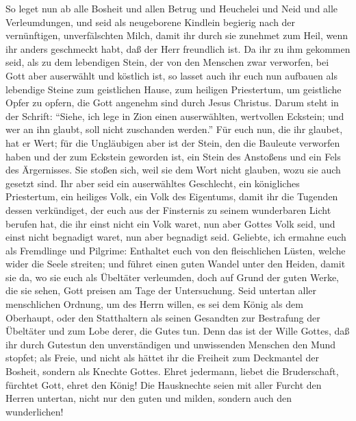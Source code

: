  So leget nun ab alle Bosheit und allen Betrug und
Heuchelei und Neid und alle Verleumdungen,  und seid als
neugeborene Kindlein begierig nach der vernünftigen, unverfälschten
Milch, damit ihr durch sie zunehmet zum Heil,  wenn ihr
anders geschmeckt habt, daß der Herr freundlich ist.  Da
ihr zu ihm gekommen seid, als zu dem lebendigen Stein, der von den
Menschen zwar verworfen, bei Gott aber auserwählt und köstlich ist,
 so lasset auch ihr euch nun aufbauen als lebendige Steine
zum geistlichen Hause, zum heiligen Priestertum, um geistliche Opfer zu
opfern, die Gott angenehm sind durch Jesus Christus. 
Darum steht in der Schrift: ``Siehe, ich lege in Zion einen
auserwählten, wertvollen Eckstein; und wer an ihn glaubt, soll nicht
zuschanden werden.''  Für euch nun, die ihr glaubet, hat
er Wert; für die Ungläubigen aber ist der Stein, den die Bauleute
verworfen haben und der zum Eckstein geworden ist, ein Stein des
Anstoßens und ein Fels des Ärgernisses.  Sie stoßen sich,
weil sie dem Wort nicht glauben, wozu sie auch gesetzt sind.
 Ihr aber seid ein auserwähltes Geschlecht, ein
königliches Priestertum, ein heiliges Volk, ein Volk des Eigentums,
damit ihr die Tugenden dessen verkündiget, der euch aus der Finsternis
zu seinem wunderbaren Licht berufen hat,  die ihr einst
nicht ein Volk waret, nun aber Gottes Volk seid, und einst nicht
begnadigt waret, nun aber begnadigt seid.  Geliebte, ich
ermahne euch als Fremdlinge und Pilgrime: Enthaltet euch von den
fleischlichen Lüsten, welche wider die Seele streiten; 
und führet einen guten Wandel unter den Heiden, damit sie da, wo sie
euch als Übeltäter verleumden, doch auf Grund der guten Werke, die sie
sehen, Gott preisen am Tage der Untersuchung.  Seid
untertan aller menschlichen Ordnung,  um des Herrn
willen, es sei dem König als dem Oberhaupt, oder den Statthaltern als
seinen Gesandten zur Bestrafung der Übeltäter und zum Lobe derer, die
Gutes tun.  Denn das ist der Wille Gottes, daß ihr durch
Gutestun den unverständigen und unwissenden Menschen den Mund stopfet;
 als Freie, und nicht als hättet ihr die Freiheit zum
Deckmantel der Bosheit, sondern als Knechte Gottes. 
Ehret jedermann, liebet die Bruderschaft, fürchtet Gott, ehret den
König!  Die Hausknechte seien mit aller Furcht den Herren
untertan, nicht nur den guten und milden, sondern auch den wunderlichen!
